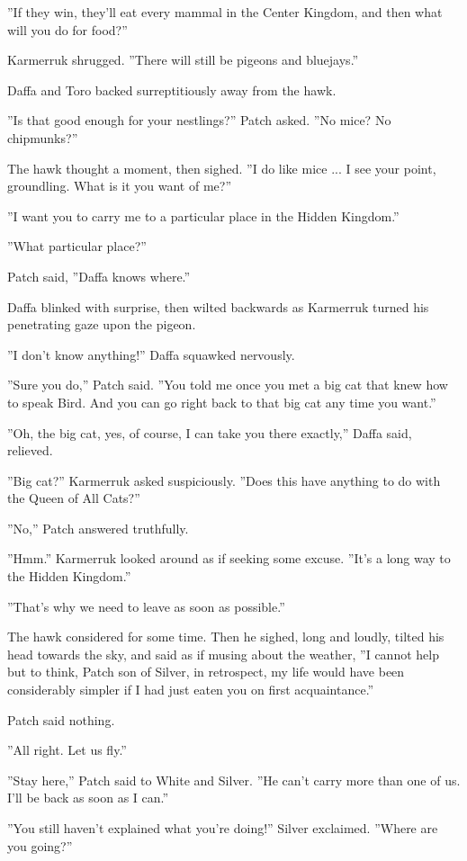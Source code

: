\documentclass[12pt]{book}
\begin{document}
''If they win, they'll eat every mammal in the Center Kingdom, and then what will you do for food?''

Karmerruk shrugged. ''There will still be pigeons and bluejays.''

Daffa and Toro backed surreptitiously away from the hawk.

''Is that good enough for your nestlings?'' Patch asked. ''No mice? No chipmunks?''

The hawk thought a moment, then sighed. ''I do like mice ... I see your point, groundling. What is it you want of me?''

''I want you to carry me to a particular place in the Hidden Kingdom.''

''What particular place?''

Patch said, ''Daffa knows where.''

Daffa blinked with surprise, then wilted backwards as Karmerruk turned his penetrating gaze upon the pigeon.

''I don't know anything!'' Daffa squawked nervously.

''Sure you do,'' Patch said. ''You told me once you met a big cat that knew how to speak Bird. And you can go right back to that big cat any time you want.''

''Oh, the big cat, yes, of course, I can take you there exactly,'' Daffa said, relieved.

''Big cat?'' Karmerruk asked suspiciously. ''Does this have anything to do with the Queen of All Cats?''

''No,'' Patch answered truthfully.

''Hmm.'' Karmerruk looked around as if seeking some excuse. ''It's a long way to the Hidden Kingdom.''

''That's why we need to leave as soon as possible.''

The hawk considered for some time. Then he sighed, long and loudly, tilted his head towards the sky, and said as if musing about the weather, ''I cannot help but to think, Patch son of Silver, in retrospect, my life would have been considerably simpler if I had just eaten you on first acquaintance.''

Patch said nothing.

''All right. Let us fly.''

''Stay here,'' Patch said to White and Silver. ''He can't carry more than one of us. I'll be back as soon as I can.''

''You still haven't explained what you're doing!'' Silver exclaimed. ''Where are you going?''
\end{document}

